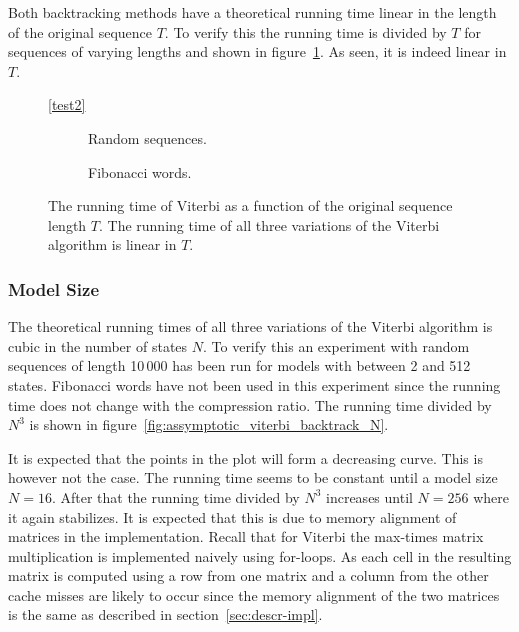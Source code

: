 Both backtracking methods have a theoretical running time linear in the length
of the original sequence $T$. To verify this the running time is divided by $T$
for sequences of varying lengths and shown in
figure~\ref{fig:assymptotic_viterbi_backtrack_T}. As seen, it is indeed linear
in $T$.

\begin{figure}
  \centering\ref{test2}
  \begin{subfigure}[b]{0.5\textwidth}
    \centering 
    \caption{Random sequences.}
  \end{subfigure}%
  \begin{subfigure}[b]{0.5\textwidth}
    \centering 
    \caption{Fibonacci words.}
  \end{subfigure}
  \caption{The running time of Viterbi as a function of the original sequence
    length $T$. The running time of all three variations of the Viterbi
    algorithm is linear in $T$.}
  \label{fig:assymptotic_viterbi_backtrack_T}
\end{figure}

\subsubsection{Model Size}

The theoretical running times of all three variations of the Viterbi algorithm
is cubic in the number of states $N$. To verify this an experiment with random
sequences of length 10\,000 has been run for models with between 2 and 512
states. Fibonacci words have not been used in this experiment since the running
time does not change with the compression ratio. The running time divided by $N^3$ is
shown in figure~\ref{fig:assymptotic_viterbi_backtrack_N}.

It is expected that the points in the plot will form a decreasing curve. This
is however not the case. The running time seems to be constant until a model
size $N = 16$. After that the running time divided by $N^3$ increases until
$N=256$ where it again stabilizes. It is expected that this is due to memory
alignment of matrices in the implementation. Recall that for Viterbi the
max-times matrix multiplication is implemented naively using for-loops. As each
cell in the resulting matrix is computed using a row from one matrix and a
column from the other cache misses are likely to occur since the memory
alignment of the two matrices is the same as described in
section~\ref{sec:descr-impl}.

